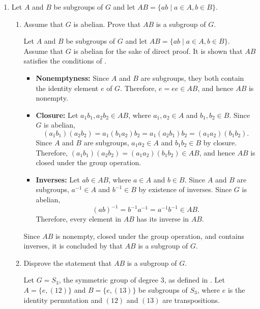 \begin{enumerate}
  \newpage



  \item Let $A$ and $B$ be subgroups of $G$ and let $A B=\{a b \mid a \in A, b \in B\}$.
  \begin{enumerate}
    \item Assume that $G$ is abelian. Prove that $A B$ is a subgroup of $G$.
    \begin{subprove}
      Let $A$ and $B$ be subgroups of $G$ and let $A B = \{a b \mid a \in A, b \in B\}$.
      Assume that $G$ is abelian for the sake of direct proof.
      It is shown that $A B$ satisfies the conditions of .
      
      \begin{itemize}
        \item \textbf{Nonemptyness:} Since $A$ and $B$ are subgroups, they both contain the identity element $e$ of $G$.
        Therefore, $e = e e \in A B$, and hence $A B$ is nonempty.
        
        \item \textbf{Closure:} Let $a_1 b_1, a_2 b_2 \in A B$, where $a_1, a_2 \in A$ and $b_1, b_2 \in B$.
        Since $G$ is abelian,
        \[
          (a_1 b_1) (a_2 b_2) = a_1 (b_1 a_2) b_2 = a_1 (a_2 b_1) b_2 = (a_1 a_2) (b_1 b_2).
        \]
        Since $A$ and $B$ are subgroups, $a_1 a_2 \in A$ and $b_1 b_2 \in B$ by closure.
        Therefore, $(a_1 b_1) (a_2 b_2) = (a_1 a_2) (b_1 b_2) \in A B$, and hence $A B$ is closed under the group operation.
        
        \item \textbf{Inverses:} Let $a b \in A B$, where $a \in A$ and $b \in B$.
        Since $A$ and $B$ are subgroups, $a^{-1} \in A$ and $b^{-1} \in B$ by existence of inverses.
        Since $G$ is abelian,
        \[
          (a b)^{-1} = b^{-1} a^{-1} = a^{-1} b^{-1} \in A B.
        \]
        Therefore, every element in $A B$ has its inverse in $A B$.
      \end{itemize}
      
      Since $A B$ is nonempty, closed under the group operation, and contains inverses,
      it is concluded by  that $A B$ is a subgroup of $G$.
    \end{subprove}
    \item Disprove the statement that $A B$ is a subgroup of $G$.
    \begin{subdisprove}      
      Let $G = S_3$, the symmetric group of degree 3, as defined in .
      Let $A = \{e, (12)\}$ and $B = \{e, (13)\}$ be subgroups of $S_3$,
      where $e$ is the identity permutation and $(12)$ and $(13)$ are transpositions.
      

\end{subdisprove}
\end{enumerate}
\end{enumerate}
